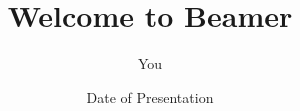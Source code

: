 \documentclass{beamer}
\title{Welcome to Beamer}
\author{You}
\institute{Where You're From}
\date{Date of Presentation}
\begin{document}
\begin{frame}
\titlepage %
\end{frame}
\end{document}
